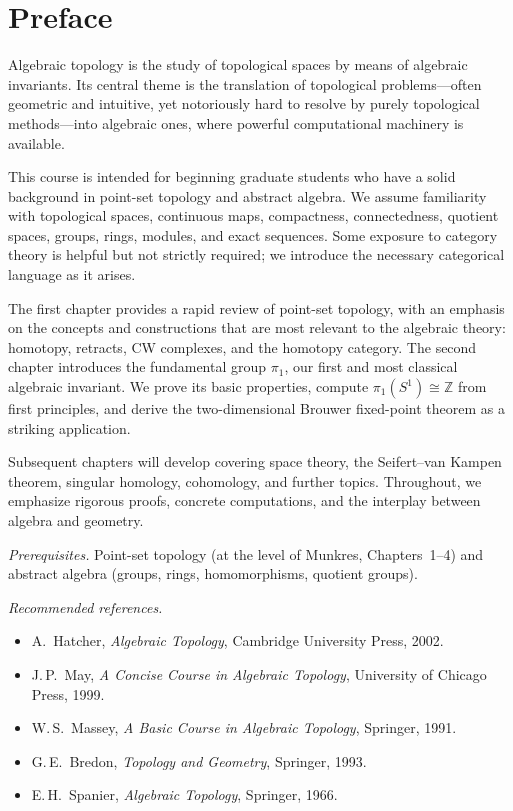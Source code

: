 \documentclass[12pt,a4paper,openany]{book}
\theoremstyle{definition}
\theoremstyle{plain}
\theoremstyle{remark}
\newcommand{\Z}{\mathbb{Z}}
\begin{document}
\chapter*{Preface}

Algebraic topology is the study of topological spaces by means of algebraic
invariants. Its central theme is the translation of topological problems---often
geometric and intuitive, yet notoriously hard to resolve by purely topological
methods---into algebraic ones, where powerful computational machinery is
available.

This course is intended for beginning graduate students who have a solid
background in point-set topology and abstract algebra. We assume familiarity
with topological spaces, continuous maps, compactness, connectedness, quotient
spaces, groups, rings, modules, and exact sequences. Some exposure to category
theory is helpful but not strictly required; we introduce the necessary
categorical language as it arises.

The first chapter provides a rapid review of point-set topology, with an
emphasis on the concepts and constructions that are most relevant to the
algebraic theory: homotopy, retracts, CW complexes, and the homotopy category.
The second chapter introduces the fundamental group $\pi_1$, our first and most
classical algebraic invariant. We prove its basic properties, compute
$\pi_1(S^1) \cong \Z$ from first principles, and derive the two-dimensional
Brouwer fixed-point theorem as a striking application.

Subsequent chapters will develop covering space theory, the Seifert--van Kampen
theorem, singular homology, cohomology, and further topics. Throughout, we
emphasize rigorous proofs, concrete computations, and the interplay between
algebra and geometry.

\medskip

\noindent\textit{Prerequisites.} Point-set topology (at the level of Munkres,
Chapters~1--4) and abstract algebra (groups, rings, homomorphisms, quotient
groups).

\medskip

\noindent\textit{Recommended references.}
\begin{itemize}[leftmargin=2em]
\item A.~Hatcher, \textit{Algebraic Topology}, Cambridge University Press, 2002.
\item J.\,P.~May, \textit{A Concise Course in Algebraic Topology}, University
  of Chicago Press, 1999.
\item W.\,S.~Massey, \textit{A Basic Course in Algebraic Topology}, Springer, 1991.
\item G.\,E.~Bredon, \textit{Topology and Geometry}, Springer, 1993.
\item E.\,H.~Spanier, \textit{Algebraic Topology}, Springer, 1966.
\end{itemize}
\end{document}
